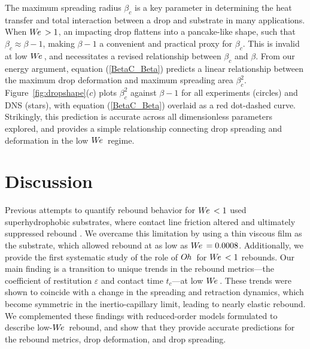 \documentclass{jfm}
\newcommand{\We}{W\kern-0.15em e\,}
\newcommand{\Oh}{O\kern-0.05em h\,}
\begin{document}
The maximum spreading radius $\beta_c$ is a key parameter in determining the heat transfer and total interaction between a drop and substrate in many applications. When $\We > 1$, an impacting drop flattens into a pancake-like shape, such that $\beta_{c} \approx \beta - 1$, making $\beta - 1$ a convenient and practical proxy for $\beta_c$. This is invalid at low $\We$, and necessitates a revised relationship between $\beta_c$ and $\beta$. From our energy argument, equation (\ref{BetaC_Beta}) predicts a linear relationship between the maximum drop deformation and maximum spreading area $\beta_c^{2}$. Figure~\ref{fig:dropshape}($c$) plots $\beta_c^{2}$ against $\beta - 1$ for all experiments (circles) and DNS (stars), with equation (\ref{BetaC_Beta}) overlaid as a red dot-dashed curve. Strikingly, this prediction is accurate across all dimensionless parameters explored, and provides a simple relationship connecting drop spreading and deformation in the low $\We$ regime.

\section{Discussion} \label{sec:discussion}

Previous attempts to quantify rebound behavior for $\We<1$ used superhydrophobic substrates, where contact line friction altered and ultimately suppressed rebound \citep{wang2022successive,thenarianto2023energy}. We overcame this limitation by using a thin viscous film as the substrate, which allowed rebound at as low as $\We=0.0008$. Additionally, we provide the first systematic study of the role of $\Oh$ for $\We<1$ rebounds. Our main finding is a transition to unique trends in the rebound metrics---the coefficient of restitution $\varepsilon$ and contact time $t_c$---at low $\We$. These trends were shown to coincide with a change in the spreading and retraction dynamics, which become symmetric in the inertio-capillary limit, leading to nearly elastic rebound. We complemented these findings with reduced-order models formulated to describe low-$\We$ rebound, and show that they provide accurate predictions for the rebound metrics, drop deformation, and drop spreading.
\end{document}
